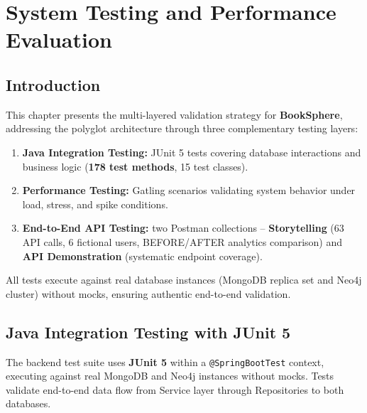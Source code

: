 \chapter{System Testing and Performance Evaluation}
\label{chap:testing}

\section{Introduction}
This chapter presents the multi-layered validation strategy for \textbf{BookSphere}, addressing the polyglot architecture through three complementary testing layers:

\begin{enumerate}
    \item \textbf{Java Integration Testing:} JUnit 5 tests covering database interactions and business logic (\textbf{178 test methods}, 15 test classes).
    \item \textbf{Performance Testing:} Gatling scenarios validating system behavior under load, stress, and spike conditions.
    \item \textbf{End-to-End API Testing:} two Postman collections -- \textbf{Storytelling} (63 API calls, 6 fictional users, BEFORE/AFTER analytics comparison) and \textbf{API Demonstration} (systematic endpoint coverage).
\end{enumerate}

All tests execute against real database instances (MongoDB replica set and Neo4j cluster) without mocks, ensuring authentic end-to-end validation.


\section{Java Integration Testing with JUnit 5}

The backend test suite uses \textbf{JUnit 5} within a \texttt{@SpringBootTest} context, executing against real MongoDB and Neo4j instances without mocks. Tests validate end-to-end data flow from Service layer through Repositories to both databases.


